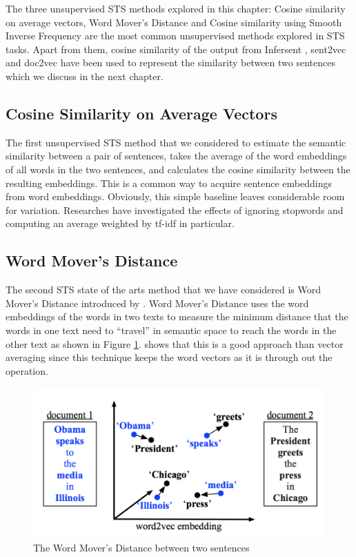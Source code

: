 The three unsupervised STS methods explored in this chapter: Cosine similarity on average vectors, Word Mover's Distance and Cosine similarity using Smooth Inverse Frequency are the most common unsupervised methods explored in STS tasks. Apart from them, cosine similarity of the output from Infersent \cite{conneau-EtAl:2017:EMNLP2017}, sent2vec \cite{pagliardini-etal-2018-unsupervised} and doc2vec \cite{10.5555/3044805.3045025} have been used to represent the similarity between two sentences which we discuss in the next chapter. 


\subsection{Cosine Similarity on Average Vectors}
The first unsupervised STS method that we considered to estimate the semantic similarity between a pair of sentences, takes the average of the word embeddings of all words in the two sentences, and calculates the cosine similarity between the resulting embeddings. This is a common way to acquire sentence embeddings from word embeddings. Obviously, this simple baseline leaves considerable room for variation. Researches have investigated the effects of ignoring stopwords and computing an average weighted by tf-idf in particular.

\subsection{Word Mover's Distance}
The second STS state of the arts method that we have considered is Word Mover's Distance introduced by \citet{10.5555/3045118.3045221}. Word Mover's Distance uses the word embeddings of the words in two texts to measure the minimum distance that the words in one text need to ``travel'' in semantic space to reach the words in the other text as shown in Figure \ref{fig:WMD}. \citet{10.5555/3045118.3045221} shows that this is a good approach than vector averaging since this technique keeps the word vectors as it is through out the operation.

\begin{figure}[ht]
	\centering
	\includegraphics[scale=0.4]{figures/semantic_textual_similarity/state_of_the_art/word_movers_distance.png}
	\caption{The Word Mover's Distance between two sentences}
	\label{fig:WMD}
\end{figure}

